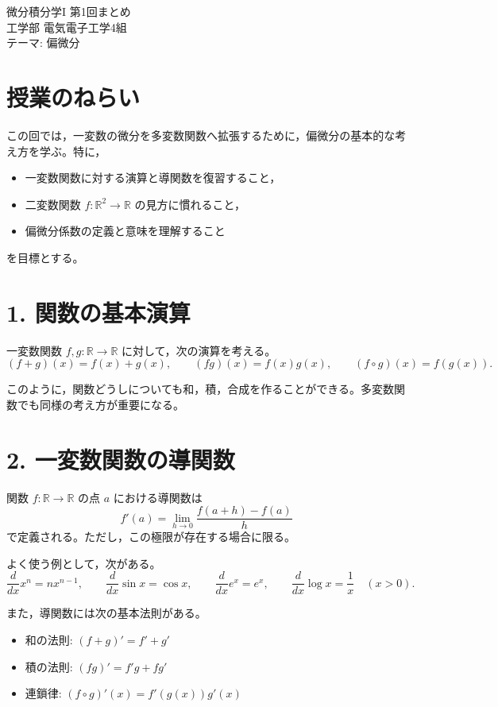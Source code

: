 \documentclass[a4paper,11pt]{jsarticle}
\begin{document}
\begin{center}
{\LARGE 微分積分学I 第1回まとめ}\\[0.4em]
工学部 電気電子工学4組\\
テーマ: 偏微分
\end{center}

\section*{授業のねらい}

この回では，一変数の微分を多変数関数へ拡張するために，偏微分の基本的な考え方を学ぶ。特に，
\begin{itemize}[leftmargin=2em]
\item 一変数関数に対する演算と導関数を復習すること，
\item 二変数関数 $f:\mathbb{R}^2 \to \mathbb{R}$ の見方に慣れること，
\item 偏微分係数の定義と意味を理解すること
\end{itemize}
を目標とする。

\section*{1. 関数の基本演算}

一変数関数 $f,g:\mathbb{R}\to\mathbb{R}$ に対して，次の演算を考える。
\[
(f+g)(x)=f(x)+g(x), \qquad (fg)(x)=f(x)g(x), \qquad (f\circ g)(x)=f(g(x)).
\]

このように，関数どうしについても和，積，合成を作ることができる。多変数関数でも同様の考え方が重要になる。

\section*{2. 一変数関数の導関数}

関数 $f:\mathbb{R}\to\mathbb{R}$ の点 $a$ における導関数は
\[
f'(a)=\lim_{h\to 0}\frac{f(a+h)-f(a)}{h}
\]
で定義される。ただし，この極限が存在する場合に限る。

よく使う例として，次がある。
\[
\frac{d}{dx}x^n = nx^{n-1}, \qquad
\frac{d}{dx}\sin x = \cos x, \qquad
\frac{d}{dx}e^x = e^x, \qquad
\frac{d}{dx}\log x = \frac{1}{x} \quad (x>0).
\]

また，導関数には次の基本法則がある。
\begin{itemize}[leftmargin=2em]
\item 和の法則: $(f+g)' = f' + g'$
\item 積の法則: $(fg)' = f'g + fg'$
\item 連鎖律: $(f\circ g)'(x) = f'(g(x))g'(x)$
\end{itemize}
\end{document}
